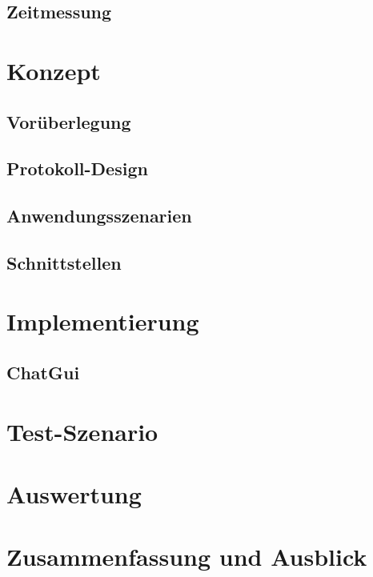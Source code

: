 \documentclass[
    11pt, %
    DIV=11,
    ngerman, %
    a4paper, %
    oneside, %
    titlepage, %
    parskip=half, %
    headings=normal, %
    listof=totoc, %
    bibliography=totoc, %
    index=totoc, %
    captions=tableheading, %
    final %
]{scrreprt}
\begin{document}
	\section{Zeitmessung}
		
	
\chapter{Konzept} \label{sec:Konzept}
	
	\section{Vorüberlegung} \label{sec:Vorueberlegung}
		
	\section{Protokoll-Design} \label{sec:ProtokolDesign}
		
	\section{Anwendungsszenarien}
		
	\section{Schnittstellen}
		
	
\chapter{Implementierung}
	
	\section{ChatGui}
	
	
\chapter{Test-Szenario}	
	
	
\chapter{Auswertung}
	
	
\chapter{Zusammenfassung und Ausblick}
	
\end{document}
